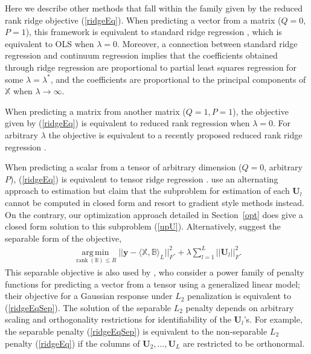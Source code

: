 \documentclass[12pt]{article}
\def\U{\mathbf{U}}
\def\XX{\mathbb{X}}
\def\BB{\mathbb{B}}
\newcommand{\tprod}[3] {
  \langle #1, #2 \rangle_{#3}}
\DeclareMathOperator*{\amin}{arg\,min}
\def\argmin#1{\underset{#1}{\amin}}
\DeclareMathOperator*{\rank}{rank}
\begin{document}
Here we describe other methods that fall within the family given by the reduced rank ridge objective (\ref{ridgeEq}).  When predicting a vector from a matrix ($Q=0$, $P=1$), this framework is equivalent to standard ridge regression \citep{hoerl1970ridge},  which is equivalent to OLS when $\lambda=0$. Moreover, a connection between standard ridge regression and continuum regression \citep{sundberg1993continuum} implies that the coefficients obtained through ridge regression are proportional to partial least squares regression for some $\lambda=\lambda^*$, and the coefficients are proportional to the principal components of $\XX$ when $\lambda \rightarrow \infty$.  

When predicting a matrix from another matrix ($Q=1, P=1$), the objective given by  (\ref{ridgeEq}) is equivalent to reduced rank regression \citep{izenman1975reduced} when $\lambda=0$.  For arbitrary $\lambda$ the objective is equivalent to a recently proposed reduced rank ridge regression \citep{mukherjee2011reduced}. 

When predicting a scalar from a tensor of arbitrary dimension ($Q=0$, arbitrary $P$),   (\ref{ridgeEq}) is equivalent to tensor ridge regression \citep{guo2012tensor}.  \citet{guo2012tensor} use an alternating approach to estimation but claim that the subproblem for estimation of each $\U_l$ cannot be computed in closed form and resort to gradient style methods instead. On the contrary, our optimization approach detailed in Section~\ref{opt} does give a closed form solution to this subproblem (\ref{upU}). Alternatively, \citet{guo2012tensor} suggest the separable form of the objective, 
\begin{align}
\argmin{\rank(\BB)\leq R} ||\mathbf{y}- \tprod{\XX}{\BB}{L}||_F^2. + \lambda \sum_{l=1}^L||\U_l||_F^2. \label{ridgeEqSep}
\end{align}
This separable objective is also used by \citet{zhou2013tensor}, who consider a power family of penalty functions for predicting a vector from a tensor using a generalized linear model; their objective for a Gaussian response under $L_2$ penalization is equivalent to (\ref{ridgeEqSep}). The solution of the separable $L_2$ penalty depends on arbitrary scaling and orthogonality restrictions for identifiability of the $\U_l$'s.  For example, the separable penalty (\ref{ridgeEqSep}) is equivalent to the non-separable $L_2$ penalty (\ref{ridgeEq}) if the columns of $\U_2,\hdots,\U_L$ are restricted to be orthonormal.  
\end{document}
